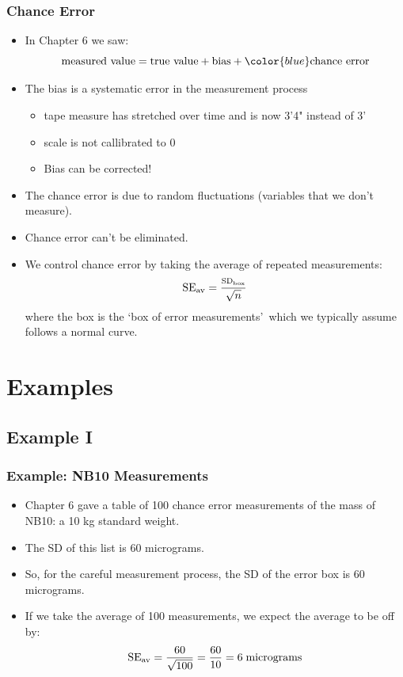 \documentclass[t]{beamer}
\begin{document}
\begin{frame}
\frametitle{Chance Error}

\footnotesize
\begin{itemize}
\item In Chapter 6 we saw:
\[\mbox{measured value} = \mbox{true value} + \mbox{bias} + {\color{blue}\mbox{chance error}}\]
\item The bias is a systematic error in the measurement process
  \begin{itemize}
  \item tape measure has stretched over time and is now 3'4" instead of  3'
  \item scale is not callibrated to 0
  \item Bias can be corrected!
  \end{itemize}
\item The chance error is due to random fluctuations (variables that we don't  measure).
\item Chance error can't be eliminated.
\item We control chance error by taking the average of repeated measurements:
\[\mbox{SE}_{\mbox{\scriptsize av}} = \frac{\mbox{\scriptsize SD}_{\mbox{\tiny box}}}{\sqrt{n}}\]
  where the box is the \lq box of error measurements\rq\ which we typically assume follows a normal curve.
\end{itemize}

\end{frame}

\section{Examples}
\subsection{Example I}
\begin{frame}
\frametitle{Example:  NB10 Measurements}

\footnotesize

\begin{itemize}
\item Chapter 6 gave a table of 100 chance error measurements of the mass of NB10:  a  10 kg standard weight.
\item The SD of this list is 60 micrograms.
\item So, for the careful measurement process, the SD of the error box is 60 micrograms.
\item If we take the average of 100 measurements, we expect the average to be off by:
\[\mbox{SE}_{\mbox{\scriptsize av}} = \frac{60}{\sqrt{100}} = \frac{60}{10} = 6 \;\mbox{micrograms}\]
\end{itemize}

\end{frame}
\end{document}

